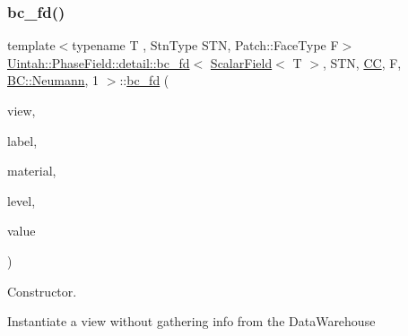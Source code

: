 \subsubsection{\texorpdfstring{bc\+\_\+fd()}{bc\_fd()}\hspace{0.1cm}{\footnotesize\ttfamily [2/3]}}
{\footnotesize\ttfamily template$<$typename T , Stn\+Type S\+TN, Patch\+::\+Face\+Type F$>$ \\
\hyperlink{classUintah_1_1PhaseField_1_1detail_1_1bc__fd}{Uintah\+::\+Phase\+Field\+::detail\+::bc\+\_\+fd}$<$ \hyperlink{structUintah_1_1PhaseField_1_1ScalarField}{Scalar\+Field}$<$ T $>$, S\+TN, \hyperlink{namespaceUintah_1_1PhaseField_a33d355affda78a83f45755ba8388cedda22303704507d024d1d6508ed9859a85a}{CC}, F, \hyperlink{namespaceUintah_1_1PhaseField_a148fba372aa3be96fd6eede7a2fa10b5ab8537a769dbc90cb1762215441212152}{B\+C\+::\+Neumann}, 1 $>$\+::\hyperlink{classUintah_1_1PhaseField_1_1detail_1_1bc__fd}{bc\+\_\+fd} (\begin{DoxyParamCaption}\item[{const \hyperlink{classUintah_1_1PhaseField_1_1detail_1_1view}{view}$<$ \hyperlink{structUintah_1_1PhaseField_1_1ScalarField}{Field} $>$ $\ast$}]{view,  }\item[{const Var\+Label $\ast$}]{label,  }\item[{int}]{material,  }\item[{const Level $\ast$}]{level,  }\item[{const V \&}]{value }\end{DoxyParamCaption})\hspace{0.3cm}{\ttfamily [inline]}}



Constructor. 

Instantiate a view without gathering info from the Data\+Warehouse


